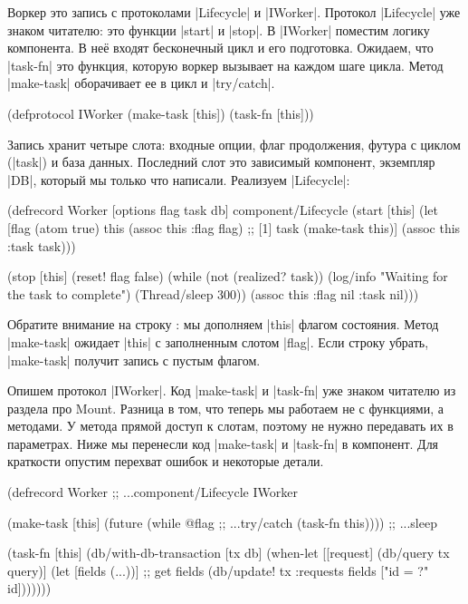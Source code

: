 Воркер это запись с протоколами \spverb|Lifecycle| и \spverb|IWorker|. Протокол
\spverb|Lifecycle| уже знаком читателю: это функции \spverb|start| и
\spverb|stop|. В \spverb|IWorker| поместим логику компонента. В не\"{е} входят
бесконечный цикл и его подготовка. Ожидаем, что \spverb|task-fn| это функция,
которую воркер вызывает на каждом шаге цикла. Метод \spverb|make-task|
оборачивает ее в цикл и \spverb|try/catch|.

\begin{english}
  \begin{clojure}
(defprotocol IWorker
  (make-task [this])
  (task-fn [this]))
  \end{clojure}
\end{english}

Запись хранит четыре слота: входные опции, флаг продолжения, футура с циклом
(\spverb|task|) и база данных. Последний слот это зависимый компонент, экземпляр
\spverb|DB|, который мы только что написали. Реализуем \spverb|Lifecycle|:

\begin{english}
  \begin{clojure}
(defrecord Worker
  [options flag task db]
  component/Lifecycle
  (start [this]
    (let [flag (atom true)
          this (assoc this :flag flag) ;; [1]
          task (make-task this)]
      (assoc this :task task)))

  (stop [this]
    (reset! flag false)
    (while (not (realized? task))
      (log/info "Waiting for the task to complete")
      (Thread/sleep 300))
    (assoc this :flag nil :task nil)))
  \end{clojure}
\end{english}

Обратите внимание на строку : мы дополняем \spverb|this| флагом
состояния. Метод \spverb|make-task| ожидает \spverb|this| с заполненным слотом
\spverb|flag|. Если строку убрать, \spverb|make-task| получит запись с пустым
флагом.

Опишем протокол \spverb|IWorker|. Код \spverb|make-task| и \spverb|task-fn| уже
знаком читателю из раздела про Mount. Разница в том, что теперь мы работаем не с
функциями, а методами. У метода прямой доступ к слотам, поэтому не нужно
передавать их в параметрах. Ниже мы перенесли код \spverb|make-task| и
\spverb|task-fn| в компонент. Для краткости опустим перехват ошибок и некоторые
детали.

\begin{english}
  \begin{clojure}
(defrecord Worker
  ;; ...component/Lifecycle
  IWorker

  (make-task [this]
    (future
      (while @flag        ;; ...try/catch
        (task-fn this)))) ;; ...sleep

  (task-fn [this]
    (db/with-db-transaction [tx db]
      (when-let [[request] (db/query tx query)]
        (let [fields (...))] ;; get fields
          (db/update! tx :requests
                      fields ["id = ?" id]))))))
  \end{clojure}
\end{english}

